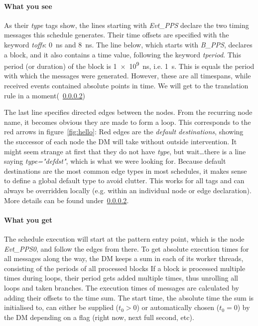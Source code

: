 \paragraph{What you see}
As their \emph{type} tags show, the lines starting with \emph{Evt\_PPS} declare the two timing messages this schedule generates. Their time offsets are specified with the keyword \emph{toffs}:
\SI{0}{\nano\second} and \SI{8}{\nano\second}. The line below, which starts with \emph{B\_PPS}, declares a block, and it also contains a time value,
following the keyword \emph{tperiod}. This period (or duration) of the block is \SI{1e9}{\nano\second}, i.e. \SI{1}{\second}.
This is equals the period with which the messages were generated. However, these are all timespans, while received events contained absolute points in time. We will get to the translation rule in a moment(~\ref{})
\par
The last line specifies directed edges between the nodes. From the recurring node name, it becomes obvious they are made to form a loop. This corresponds to the red arrows in figure~\ref{fig:hello}: Red edges are the \emph{default destinations},
showing the successor of each node the DM will take without outside intervention. It might seem strange at first that they do not have \emph{type}, but wait\dots there is a line saying \emph{type="defdst"}, which is what we were looking for.
Because default destinations are the most common edge types in most schedules, it makes sense to define a global default type to avoid clutter. This works for all tags and can always be overridden locally (e.g. within an individual node or edge declaration). More details can be found under~\ref{}.
\paragraph{What you get}
The schedule execution will start at the pattern entry point, which is the node \emph{Evt\_PPS0}, and follow the edges from there.
To get absolute execution times for all messages along the way, the DM keeps a sum in each of its worker threads, consisting of the periods of all processed blocks If a block is processed multiple times during loops, their period gets added multiple times, thus unrolling all loops and taken branches. The execution times of messages are calculated
by adding their offsets to the time sum. The start time, the absolute time the sum is initialised to, can either be supplied ($t_0>0$) or automatically chosen ($t_0=0$) by the DM depending on a flag (right now, next full second, etc).

